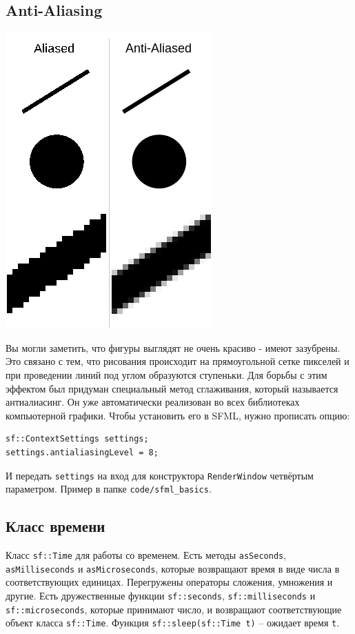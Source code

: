 \documentclass{article}
\begin{document}
\newpage
\subsection*{Anti-Aliasing}
\begin{multicols}{2}
\begin{center}
\includegraphics[scale=0.5]{../images/anti-aliasing.png}
\end{center}
Вы могли заметить, что фигуры выглядят не очень красиво - имеют зазубрены. Это связано с тем, что рисования происходит на прямоугольной сетке пикселей и при проведении линий под углом образуются ступеньки. Для борьбы с этим эффектом был придуман специальный метод сглаживания, который называется антиалиасинг. Он уже автоматически реализован во всех библиотеках компьютерной графики. Чтобы установить его в SFML, нужно прописать опцию:
\begin{lstlisting}
sf::ContextSettings settings;
settings.antialiasingLevel = 8;
\end{lstlisting}
И передать \texttt{settings} на вход для конструктора \texttt{RenderWindow} четвёртым параметром. Пример в папке \texttt{code/sfml\_basics}.
\end{multicols}


\subsection*{Класс времени}
Класс \texttt{sf::Time} для работы со временем. Есть методы \texttt{asSeconds}, \texttt{asMilliseconds} и \texttt{asMicroseconds}, которые возвращают время в виде числа в соответствующих единицах. Перегружены операторы сложения, умножения и другие. Есть дружественные функции \texttt{sf::seconds}, \texttt{sf::milliseconds} и \texttt{sf::microseconds}, которые принимают число, и возвращают соответствующие объект класса \texttt{sf::Time}. Функция \texttt{sf::sleep(sf::Time t)} -- ожидает время \texttt{t}.
\end{document}
